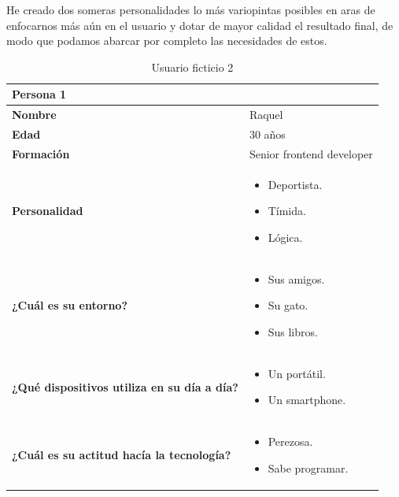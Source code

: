 He creado dos someras personalidades lo más variopintas posibles en aras de enfocarnos más aún en el usuario y dotar de mayor calidad el resultado final, de modo que podamos abarcar por completo las necesidades de estos.

\begin{table}[H]
   \begin{center}
      \begin{tabular}{| p{} |
                   p{} |}
         \hline
         Persona 1 &  \\ \hline
         \textbf{Nombre} & Raquel \\
         \textbf{Edad} & 30 años \\
         \textbf{Formación} & Senior frontend developer \\
         \textbf{Personalidad} & \begin{itemize}
                \item Deportista.
                \item Tímida.
                \item Lógica.
            \end{itemize} \\
         \textbf{¿Cuál es su entorno?} & \begin{itemize}
                \item Sus amigos.
                \item Su gato.
                \item Sus libros.
            \end{itemize} \\
         \textbf{¿Qué dispositivos utiliza en su día a día?} & \begin{itemize}
                \item Un portátil.
                \item Un smartphone.
            \end{itemize} \\
            \textbf{¿Cuál es su actitud hacía la tecnología?} & \begin{itemize}
                \item Perezosa.
                \item Sabe programar.
            \end{itemize} \\
            \hline
      \end{tabular}
      \caption{Usuario ficticio 2}
   \end{center}
\end{table}

